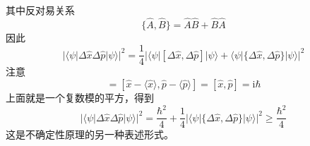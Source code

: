         其中反对易关系
        \begin{equation*}
            \{\hat{A}, \hat{B}\} = \hat{A}\hat{B} + \hat{B}\hat{A}
        \end{equation*}
        因此
        \begin{equation*}
            |\langle \psi |\Delta \hat{x} \Delta \hat{p}|\psi \rangle|^2 = \frac 14 |\langle \psi |[\Delta \hat{x},\Delta \hat{p}]|\psi \rangle + \langle \psi |\{\Delta \hat{x},\Delta \hat{p}\}|\psi \rangle|^2
        \end{equation*}
        注意
        \begin{equation*}
            [\Delta \hat{x},\Delta \hat{p}] = [\hat{x}-\langle \hat{x} \rangle, \hat{p}-\langle \hat{p} \rangle ] = [\hat{x},\hat{p}] = \mathrm{i}\hbar
        \end{equation*}
        上面就是一个复数模的平方，得到
        \begin{equation*}
            |\langle \psi |\Delta \hat{x} \Delta \hat{p}|\psi \rangle|^2 = \frac {\hbar^2}4 + \frac 14 |\langle \psi |\{\Delta \hat{x},\Delta \hat{p}\}|\psi \rangle|^2 \geqslant \frac {\hbar^2}4
        \end{equation*}
        这是不确定性原理的另一种表述形式。

